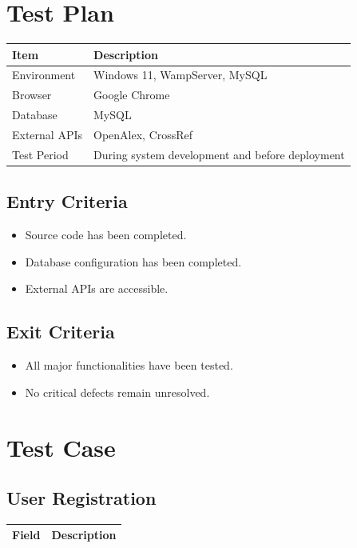 \documentclass[12pt,a4paper]{article}
\begin{document}
{{\begin{table}[H]
\end{table}

\section{Test Plan}
\begin{table}[H]
	\centering
	\begin{tabular}{|p{4cm}|p{8cm}|}
		\hline
		\textbf{Item} & \textbf{Description} \\ \hline
		Environment & Windows 11, WampServer, MySQL \\ \hline
		Browser & Google Chrome \\ \hline
		Database & MySQL \\ \hline
		External APIs & OpenAlex, CrossRef \\ \hline
		Test Period & During system development and before deployment \\ \hline
	\end{tabular}

\end{table}

\subsection{Entry Criteria}
\begin{itemize}
	\item Source code has been completed.
	\item Database configuration has been completed.
	\item External APIs are accessible.
\end{itemize}

\subsection{Exit Criteria}

\begin{itemize}
	\item All major functionalities have been tested.
	\item No critical defects remain unresolved.
\end{itemize}

\section{Test Case}

\subsection{User Registration}
\begin{table}[H]
	\centering
	\small
	\begin{tabular}{|p{4cm}|p{10cm}|}
		\hline
		\textbf{Field} & \textbf{Description} \\
		\hline
		

\end{tabular}
\end{table}}}
\end{document}
